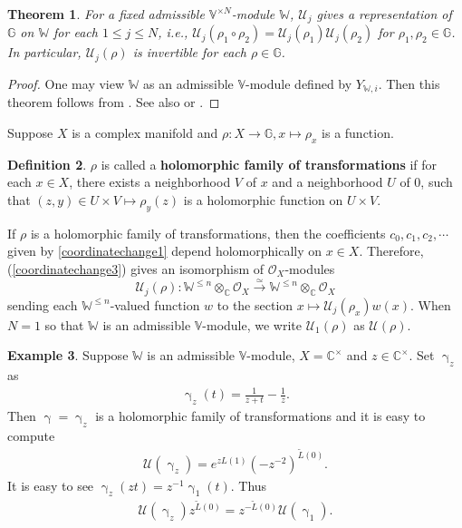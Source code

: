 \documentclass[11pt,b5paper,notitlepage]{article}
\theoremstyle{definition}
\newtheorem{df}{Definition}[section]
\newtheorem{eg}[df]{Example}
\theoremstyle{plain}
\newtheorem{thm}[df]{Theorem}
\newcommand{\mc}{\mathcal}
\newcommand{\wtd}{\widetilde}
\newcommand{\Vbb}{\mathbb V}
\newcommand{\Wbb}{\mathbb W}
\newcommand{\Gbb}{\mathbb G}
\newcommand{\Cbb}{\mathbb C}
\newcommand{\<}{\left\langle}
\renewcommand{\>}{\right\rangle}
\newcommand{\MO}{\mathcal{O}}
\newcommand{\MU}{\mathcal{U}}
\numberwithin{equation}{section}
\begin{document}
\begin{thm}\label{coordinatechange5}
For a fixed admissible $\Vbb^{\times N}$-module $\Wbb$, $\MU_j$ gives a representation of $\Gbb$ on $\Wbb$ for each $1\leq j\leq N$, i.e., $\MU_j(\rho_1\circ \rho_2)=\MU_j(\rho_1)\MU_j(\rho_2)$ for $\rho_1,\rho_2\in \Gbb$. In particular, $\MU_j(\rho)$ is invertible for each $\rho\in \Gbb$.
\end{thm}

\begin{proof}
One may view $\Wbb$ as an admissible $\Vbb$-module defined by $Y_{\Wbb,i}$. Then this theorem follows from \cite[Sec. 4.2]{Hua97}. See also \cite[Ch. 6]{FB04} or \cite[Sec. 10]{GuiLec}.
\end{proof}

Suppose $X$ is a complex manifold and $\rho:X\rightarrow \Gbb,x\mapsto \rho_x$ is a function. 
\begin{df}
    $\rho$ is called a \textbf{holomorphic family of transformations} if for each $x\in X$, there exists a neighborhood $V$ of $x$ and a neighborhood $U$ of 0, such that $(z,y)\in U\times V\mapsto \rho_y(z)$ is a holomorphic function on $U\times V$.
\end{df}
If $\rho$ is a holomorphic family of transformations, then the coefficients $c_0,c_1,c_2,\cdots$ given by \eqref{coordinatechange1} depend holomorphically on $x\in X$. Therefore, (\ref{coordinatechange3}) gives an isomorphism of $\MO_X$-modules
\begin{equation}\label{coordinatechange4}
\MU_j(\rho):\Wbb^{\leq n}\otimes_\Cbb \MO_X\xrightarrow{\simeq} \Wbb^{\leq n}\otimes_\Cbb \MO_X
\end{equation}
sending each $\Wbb^{\leq n}$-valued function $w$ to the section $x\mapsto \MU_j(\rho_x)w(x)$. When $N=1$ so that $\Wbb$ is an admissible $\Vbb$-module, we write $\mc U_1(\rho)$ as $\mc U(\rho)$.

\begin{eg}\label{changeexample1}
    Suppose $\Wbb$ is an admissible $\Vbb$-module, $X=\Cbb^\times$ and $z\in \Cbb^\times$. Set $\upgamma_z$ as 
    \begin{align*}
        \upgamma_z(t)=\frac{1}{z+t}-\frac{1}{z}.
    \end{align*}
    Then $\upgamma=\upgamma_z$ is a holomorphic family of transformations and it is easy to compute \index{U@$\MU(\upgamma_z)$}
    \begin{align}
        \MU(\upgamma_z)=e^{zL(1)}(-z^{-2})^{\wtd L(0)}.  \label{eq40}
    \end{align}
It is easy to see $\upgamma_z(zt)=z^{-1}\upgamma_1(t)$. Thus
\begin{align}
\mc U(\upgamma_z)z^{\wtd L(0)}=z^{-\wtd L(0)}\mc U(\upgamma_1).  \label{eq43}
\end{align}
\end{eg}
\end{document}
